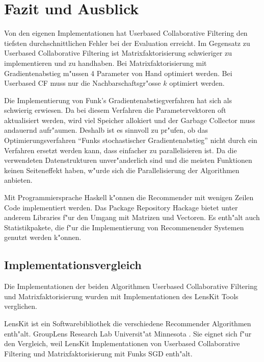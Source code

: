 \documentclass[a4paper, 12pt]{article}
\begin{document}
\section{Fazit und Ausblick}
\label{sec:fazit}

Von den eigenen Implementationen hat Userbased Collaborative Filtering den tiefsten durchschnittlichen Fehler bei der Evaluation erreicht. Im Gegensatz zu Userbased Collaborative Filtering ist Matrixfaktorisierung schwieriger zu implementieren und zu handhaben. Bei Matrixfaktorisierung mit Gradientenabstieg m"ussen 4 Parameter von Hand optimiert werden. Bei Userbased CF muss nur die Nachbarschaftsgr"osse $k$ optimiert werden.

Die Implementierung von Funk's Gradientenabstiegverfahren hat sich als schwierig erwiesen. Da bei diesem Verfahren die Parametervektoren oft aktualisiert werden, wird viel Speicher allokiert und der Garbage Collector muss andauernd aufr"aumen. Deshalb ist es sinnvoll zu pr"ufen, ob das Optimierungsverfahren ``Funks stochastischer Gradientenabstieg'' nicht durch ein Verfahren ersetzt werden kann, dass einfacher zu parallelisieren ist. Da die verwendeten Datenstrukturen unver"anderlich sind und die meisten Funktionen keinen Seiteneffekt haben, w"urde sich die Parallelisierung der Algorithmen anbieten.

Mit Programmiersprache Haskell k"onnen die Recommender mit wenigen Zeilen Code implementiert werden. Das Package Repository Hackage bietet unter anderem Libraries f"ur den Umgang mit Matrizen und Vectoren. Es enth"alt auch Statistikpakete, die f"ur die Implementierung von Recommenender Systemen genutzt werden k"onnen.

\subsection{Implementationsvergleich}
\label{sec:compare}

Die Implementationen der beiden Algorithmen Userbased Collaborative Filtering und Matrixfaktorisierung wurden mit Implementationen des LensKit Tools verglichen. 

LensKit ist ein Softwarebibliothek die verschiedene Recommender Algorithmen enth"alt. GroupLens Research Lab Universit"at Minnesota \cite{ekstrandlk11}. Sie eignet sich f"ur den Vergleich, weil LensKit Implementationen von Userbased Collaborative Filtering und Matrixfaktorisierung mit Funks SGD enth"alt.
\end{document}

